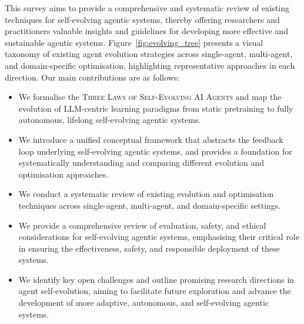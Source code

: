\documentclass[]{selfevolagent}
\theoremstyle{plain}
\theoremstyle{definition}
\theoremstyle{remark}
\newcommand{\ThreeLaws}{{\scshape\color{selfevolagent_dark!120} Three Laws of Self-Evolving AI Agents}}
\begin{document}
This survey aims to provide a comprehensive and systematic review of existing techniques for self-evolving agentic systems, thereby offering researchers and practitioners valuable insights and guidelines for developing more effective and sustainable agentic systems. Figure~\ref{fig:evolving_tree} presents a visual taxonomy of existing agent evolution strategies across single-agent, multi-agent, and domain-specific optimisation, highlighting representative approaches in each direction. 
Our main contributions are as follows: 

\begin{itemize}
    \item We formalise the \ThreeLaws{} and map the evolution of LLM-centric learning paradigms from static pretraining to fully autonomous, lifelong self-evolving agentic systems.
    \item We introduce a unified conceptual framework that abstracts the feedback loop underlying self-evolving agentic systems, and provides a foundation for systematically understanding and comparing different evolution and optimisation approaches. 
    \item We conduct a systematic review of existing evolution and optimisation techniques across single-agent, multi-agent, and domain-specific settings. 
    \item We provide a comprehensive review of evaluation, safety, and ethical considerations for self-evolving agentic systems, emphasising their critical role in ensuring the effectiveness, safety, and responsible deployment of these systems. %
    \item We identify key open challenges and outline promising research directions in agent self-evolution, aiming to facilitate future exploration and advance the development of more adaptive, autonomous, and self-evolving agentic systems. 
\end{itemize}
\end{document}
